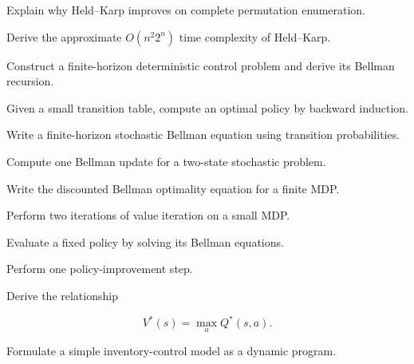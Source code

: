 \begin{exercise}[3]
Explain why Held--Karp improves on complete permutation enumeration.
\end{exercise}

\begin{exercise}[3]
Derive the approximate \(O(n^2 2^n)\) time complexity of Held--Karp.
\end{exercise}

\begin{exercise}[3]
Construct a finite-horizon deterministic control problem and derive its
Bellman recursion.
\end{exercise}

\begin{exercise}[3]
Given a small transition table, compute an optimal policy by backward
induction.
\end{exercise}

\begin{exercise}[3]
Write a finite-horizon stochastic Bellman equation using transition
probabilities.
\end{exercise}

\begin{exercise}[3]
Compute one Bellman update for a two-state stochastic problem.
\end{exercise}

\begin{exercise}[3]
Write the discounted Bellman optimality equation for a finite MDP.
\end{exercise}

\begin{exercise}[3]
Perform two iterations of value iteration on a small MDP.
\end{exercise}

\begin{exercise}[3]
Evaluate a fixed policy by solving its Bellman equations.
\end{exercise}

\begin{exercise}[3]
Perform one policy-improvement step.
\end{exercise}

\begin{exercise}[3]
Derive the relationship

\[
V^*(s)=\max_aQ^*(s,a).
\]
\end{exercise}

\begin{exercise}[3]
Formulate a simple inventory-control model as a dynamic program.
\end{exercise}

